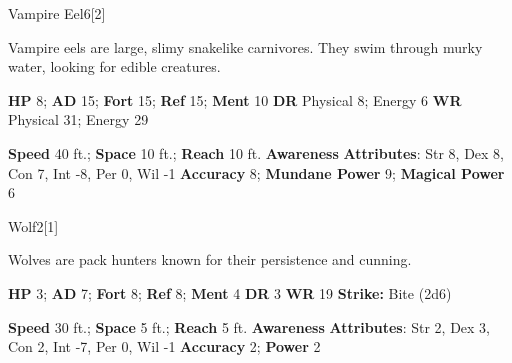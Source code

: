   \begin{monsection}{Vampire Eel}{6}[2]
    \vspace{-1em}\vspace{-1em}
    \vspace{0em}

    
      Vampire eels are large, slimy snakelike carnivores.
      They swim through murky water, looking for edible creatures.
    

    \begin{spellcontent}
      \begin{spelltargetinginfo}
        \pari \textbf{HP} 8;
          \textbf{AD} 15;
          \textbf{Fort} 15;
          \textbf{Ref} 15;
          \textbf{Ment} 10
        \pari \textbf{DR} Physical 8; Energy 6
        \pari \textbf{WR} Physical 31; Energy 29
        
      \end{spelltargetinginfo}
    \end{spellcontent}
    \begin{monsterfooter}
      \pari \textbf{Speed} 40 ft.;
        \textbf{Space} 10 ft.;
        \textbf{Reach} 10 ft.
      \pari \textbf{Awareness} 
      \pari \textbf{Attributes}:
        Str 8, Dex 8,
        Con 7, Int -8,
        Per 0, Wil -1
      \pari \textbf{Accuracy} 8;
        \textbf{Mundane Power} 9;
      \textbf{Magical Power} 6
    \end{monsterfooter}
  \end{monsection}
  
  
  \begin{monsection}{Wolf}{2}[1]
    \vspace{-1em}\vspace{-1em}
    \vspace{0em}

    
      Wolves are pack hunters known for their persistence and cunning.
    

    \begin{spellcontent}
      \begin{spelltargetinginfo}
        \pari \textbf{HP} 3;
          \textbf{AD} 7;
          \textbf{Fort} 8;
          \textbf{Ref} 8;
          \textbf{Ment} 4
        \pari \textbf{DR} 3
        \pari \textbf{WR} 19
        \pari \textbf{Strike:}
            Bite  (2d6)
      \end{spelltargetinginfo}
    \end{spellcontent}
    \begin{monsterfooter}
      \pari \textbf{Speed} 30 ft.;
        \textbf{Space} 5 ft.;
        \textbf{Reach} 5 ft.
      \pari \textbf{Awareness} 
      \pari \textbf{Attributes}:
        Str 2, Dex 3,
        Con 2, Int -7,
        Per 0, Wil -1
      \pari \textbf{Accuracy} 2;
        \textbf{Power} 2
    \end{monsterfooter}
  \end{monsection}
  
